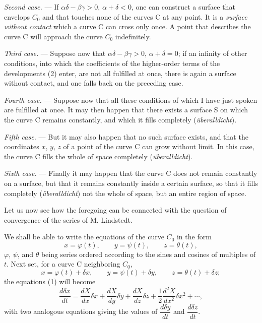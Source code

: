 \documentclass[11pt]{article}
\begin{document}
\emph{Second case.} --- If $\alpha\delta-\beta\gamma>0$, $\alpha+\delta<0$, one can construct a surface that envelops $C_0$ and that touches none of the curves C at any point. It is a \emph{surface without contact} which a curve C can cross only once. A point that describes the curve C will approach the curve $C_0$ indefinitely.

\emph{Third case.} --- Suppose now that $\alpha\delta-\beta\gamma>0$, $\alpha+\delta=0$; if an infinity of other conditions, into which the coefficients of the higher-order terms of the developments (2) enter, are not all fulfilled at once, there is again a surface without contact, and one falls back on the preceding case.

\emph{Fourth case.} --- Suppose now that all these conditions of which I have just spoken are fulfilled at once. It may then happen that there exists a surface S on which the curve C remains constantly, and which it fills completely (\emph{überalldicht}).

\emph{Fifth case.} --- But it may also happen that no such surface exists, and that the coordinates $x$, $y$, $z$ of a point of the curve C can grow without limit. In this case, the curve C fills the whole of space completely (\emph{überalldicht}).

\emph{Sixth case.} --- Finally it may happen that the curve C does not remain constantly on a surface, but that it remains constantly inside a certain surface, so that it fills completely (\emph{überalldicht}) not the whole of space, but an entire region of space.

Let us now see how the foregoing can be connected with the question of convergence of the series of M. Lindstedt.

We shall be able to write the equations of the curve $C_0$ in the form
\begin{equation}\tag{3}
x=\varphi(t),\qquad y=\psi(t),\qquad z=\theta(t),
\end{equation}
$\varphi$, $\psi$, and $\theta$ being series ordered according to the sines and cosines of multiples of $t$. Next set, for a curve C neighboring $C_0$,
\[
x=\varphi(t)+\delta x,\qquad
 y=\psi(t)+\delta y,\qquad
 z=\theta(t)+\delta z;
\]
the equations (1) will become
\begin{equation}\tag{4}
\frac{d\delta x}{dt}
=\frac{dX}{dx}\delta x+\frac{dX}{dy}\delta y+\frac{dX}{dz}\delta z+
\frac{1}{2}\frac{d^2X}{dx^2}\delta x^2+\cdots,
\end{equation}
with two analogous equations giving the values of $\dfrac{d\delta y}{dt}$ and $\dfrac{d\delta z}{dt}$.
\end{document}
